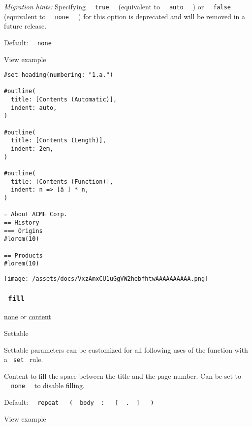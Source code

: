 \emph{Migration hints:} Specifying
\texttt{\ }{\texttt{\ true\ }}\texttt{\ } (equivalent to
\texttt{\ }{\texttt{\ auto\ }}\texttt{\ } ) or
\texttt{\ }{\texttt{\ false\ }}\texttt{\ } (equivalent to
\texttt{\ }{\texttt{\ none\ }}\texttt{\ } ) for this option is
deprecated and will be removed in a future release.

Default: \texttt{\ }{\texttt{\ none\ }}\texttt{\ }


View example

\begin{verbatim}
#set heading(numbering: "1.a.")

#outline(
  title: [Contents (Automatic)],
  indent: auto,
)

#outline(
  title: [Contents (Length)],
  indent: 2em,
)

#outline(
  title: [Contents (Function)],
  indent: n => [â ] * n,
)

= About ACME Corp.
== History
=== Origins
#lorem(10)

== Products
#lorem(10)
\end{verbatim}

\texttt{[image: /assets/docs/VxzAmxCU1uGgVW2hebfhtwAAAAAAAAAA.png]}

\subsubsection{\texorpdfstring{\texttt{\ fill\ }}{ fill }}\label{parameters-fill}

\href{/docs/reference/foundations/none/}{none} {or}
\href{/docs/reference/foundations/content/}{content}

{{ Settable }}

\label{parameters-fill-settable-tooltip}
Settable parameters can be customized for all following uses of the
function with a \texttt{\ set\ } rule.

Content to fill the space between the title and the page number. Can be
set to \texttt{\ }{\texttt{\ none\ }}\texttt{\ } to disable filling.

Default:
\texttt{\ }{\texttt{\ repeat\ }}\texttt{\ }{\texttt{\ (\ }}\texttt{\ body\ }{\texttt{\ :\ }}\texttt{\ }{\texttt{\ {[}\ }}\texttt{\ .\ }{\texttt{\ {]}\ }}\texttt{\ }{\texttt{\ )\ }}\texttt{\ }


View example

